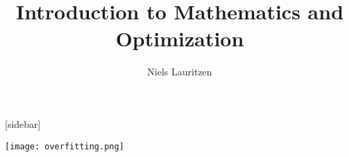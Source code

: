 \documentclass{article}
\title{Introduction to Mathematics and Optimization}
\author{Niels Lauritzen}
\begin{document}
[sidebar]

\maketitle

\texttt{[image: overfitting.png]}
 
\end{document}
